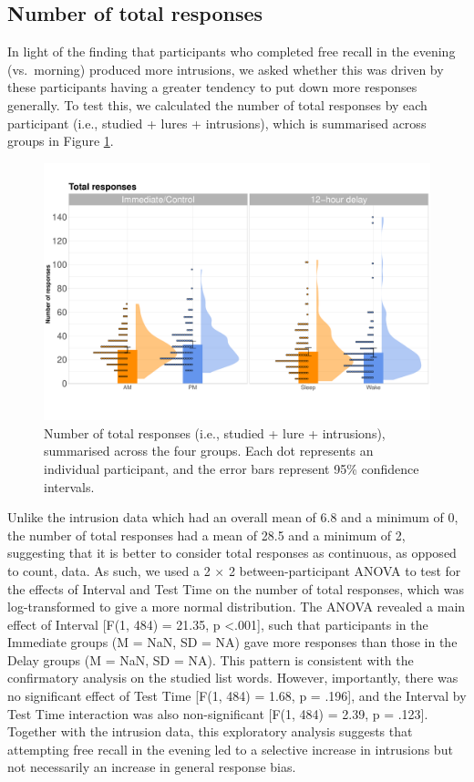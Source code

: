 \documentclass[
]{article}
\begin{document}
\hypertarget{number-of-total-responses}{%
\subsection{Number of total responses}\label{number-of-total-responses}}

In light of the finding that participants who completed free recall in the evening (vs.~morning) produced more intrusions, we asked whether this was driven by these participants having a greater tendency to put down more responses generally. To test this, we calculated the number of total responses by each participant (i.e., studied + lures + intrusions), which is summarised across groups in Figure \ref{fig:totalfig}.

\begin{figure}

{\centering \includegraphics{Figures/totalgraph} 

}

\caption{Number of total responses (i.e., studied + lure + intrusions), summarised across the four groups. Each dot represents an individual participant, and the error bars represent 95\% confidence intervals.}\label{fig:totalfig}
\end{figure}

Unlike the intrusion data which had an overall mean of 6.8 and a minimum of 0, the number of total responses had a mean of 28.5 and a minimum of 2, suggesting that it is better to consider total responses as continuous, as opposed to count, data. As such, we used a 2 \(\times\) 2 between-participant ANOVA to test for the effects of Interval and Test Time on the number of total responses, which was log-transformed to give a more normal distribution. The ANOVA revealed a main effect of Interval {[}F(1, 484) = 21.35, p \textless.001{]}, such that participants in the Immediate groups (M = NaN, SD = NA) gave more responses than those in the Delay groups (M = NaN, SD = NA). This pattern is consistent with the confirmatory analysis on the studied list words. However, importantly, there was no significant effect of Test Time {[}F(1, 484) = 1.68, p = .196{]}, and the Interval by Test Time interaction was also non-significant {[}F(1, 484) = 2.39, p = .123{]}. Together with the intrusion data, this exploratory analysis suggests that attempting free recall in the evening led to a selective increase in intrusions but not necessarily an increase in general response bias.
\end{document}
